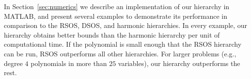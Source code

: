 \documentclass[11pt]{article}
\numberwithin{theorem}{section}
\theoremstyle{definition}
\newcommand{\field}{\mathbb{F}}
\newcommand{\real}{\mathbb{R}}
\newcommand\V{\mathcal{V}}
\newcommand\U{\mathcal{U}}
\newcommand{\Vr}{\V_{\real}}
\begin{document}
In Section~\ref{sec:numerics} we describe an implementation of our hierarchy in MATLAB, and present several examples to demonstrate its performance in comparison to the RSOS, DSOS, and harmonic hierarchies. In every example, our hierarchy obtains better bounds than the harmonic hierarchy per unit of computational time. If the polynomial is small enough that the RSOS hierarchy can be run, RSOS outperforms all other hierarchies. For larger problems (e.g., degree $4$ polynomials in more than $25$ variables), our hierarchy outperforms the rest.








\end{document}
